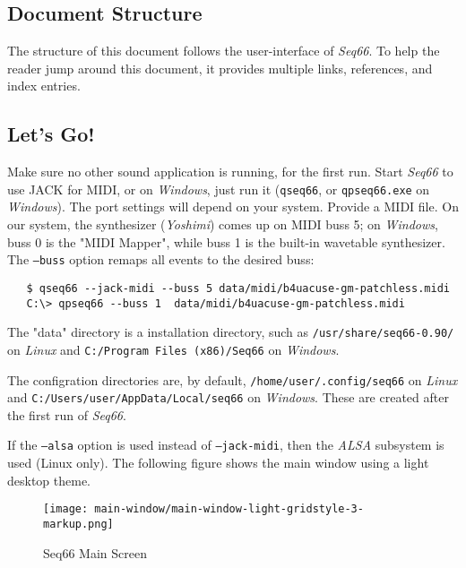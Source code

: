 \documentclass[
 11pt,
 twoside,
 a4paper,
 headinclude,
 footinclude,
 final                                 %
]{article}
\begin{document}
\subsection{Document Structure}
\label{subsec:introduction_document_structure}

   The structure of this document follows the user-interface of
   \textsl{Seq66}.
   To help the reader jump around this document, it provides
   multiple links, references, and index entries.

\subsection{Let's Go!}
\label{subsec:introduction_lets_go}

   Make sure no other sound application is running, for the first run.
   Start \textsl{Seq66} to use JACK for MIDI, or
   on \textsl{Windows}, just run it (\texttt{qseq66}, or \texttt{qpseq66.exe}
   on \textsl{Windows}).
   The port settings will depend on your system.  Provide a MIDI file.
   On our system, the synthesizer (\textsl{Yoshimi}) comes up on MIDI buss 5;
   on \textsl{Windows}, buss 0 is the "MIDI Mapper", while buss 1 is the
   built-in wavetable synthesizer.
   The \texttt{--buss} option remaps all events to the desired buss:

\begin{verbatim}
   $ qseq66 --jack-midi --buss 5 data/midi/b4uacuse-gm-patchless.midi
   C:\> qpseq66 --buss 1  data/midi/b4uacuse-gm-patchless.midi
\end{verbatim}

   The "data" directory is a installation directory, such as
   \texttt{/usr/share/seq66-0.90/} on \textsl{Linux} and
   \texttt{C:/Program Files (x86)/Seq66} on \textsl{Windows}.

   The configration directories are, by default,
   \texttt{/home/user/.config/seq66} on \textsl{Linux} and
   \texttt{C:/Users/user/AppData/Local/seq66} on \textsl{Windows}.
   These are created after the first run of \textsl{Seq66}.

   If the \texttt{--alsa} option is used instead of
   \texttt{--jack-midi}, then the \textsl{ALSA} subsystem is used
   (Linux only).  The following figure shows the main window
   using a light desktop theme.

\begin{figure}[H]
   \centering 
   \texttt{[image: main-window/main-window-light-gridstyle-3-markup.png]}
   \caption{Seq66 Main Screen}
   \label{fig:main_screen}
\end{figure}
\end{document}
